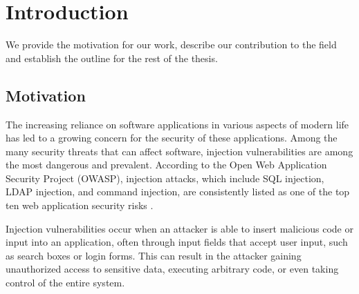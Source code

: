 \chapter{Introduction}
\label{chapter:introduction}

\begin{comment}
	Your introduction goes here
	\begin{itemize}
		\item Generic description of the broad field of research
		\item Current state of research
		\item What's the gap that you're trying to fill?
		\item Short motivation
		\item Summary of the most important results
		\item Your contribution
		\item Structure of the thesis
	\end{itemize}
	
	1-2.5 pages
	
	This text is not too detailed. Start quite high-level, then narrow down until
	you reach your topic. After the introduction, the reader must want to read the
	rest of your thesis and understand the relevance. However, it doesn't have to
	be super technical.
\end{comment}

We provide the motivation for our work, describe our contribution to the field and establish the outline for the rest of the thesis.

\section{Motivation}

The increasing reliance on software applications in various aspects of modern life has led to a growing concern for the security of these applications. Among the many security threats that can affect software, injection vulnerabilities are among the most dangerous and prevalent. According to the Open Web Application Security Project (OWASP), injection attacks, which include SQL injection, LDAP injection, and command injection, are consistently listed as one of the top ten web application security risks \cite{owasp}.

Injection vulnerabilities occur when an attacker is able to insert malicious code or input into an application, often through input fields that accept user input, such as search boxes or login forms. This can result in the attacker gaining unauthorized access to sensitive data, executing arbitrary code, or even taking control of the entire system.

